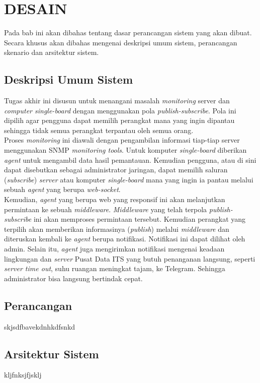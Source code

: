 \chapter{DESAIN}
\label{chapter:desain}

\tab Pada bab ini akan dibahas tentang dasar perancangan sistem yang akan dibuat. Secara khusus akan dibahas mengenai deskripsi umum sistem, perancangan skenario dan arsitektur
sistem.

\section{Deskripsi Umum Sistem}
\tab Tugas akhir ini disusun untuk menangani masalah \textit{monitoring} server dan \textit{computer single-board} dengan menggunakan pola \textit{publish-subscribe}. Pola ini dipilih agar pengguna dapat memilih perangkat mana yang ingin dipantau sehingga tidak semua perangkat terpantau oleh semua orang.\\
\tab Proses \textit{monitoring} ini diawali dengan pengambilan informasi tiap-tiap server menggunakan SNMP \textit{monitoring tools}. Untuk komputer \textit{single-board} diberikan \textit{agent} untuk mengambil data hasil pemantauan. Kemudian pengguna, atau di sini dapat disebutkan sebagai administrator jaringan, dapat memilih saluran (\textit{subscribe}) \textit{server} atau komputer \textit{single-board} mana yang ingin ia pantau melalui sebuah \textit{agent} yang berupa \textit{web-socket}.\\ 
\tab Kemudian, \textit{agent} yang berupa web yang responsif ini akan melanjutkan permintaan ke sebuah \textit{middleware}. \textit{Middleware} yang telah terpola \textit{publish-subscribe} ini akan memproses permintaan tersebut. Kemudian perangkat yang terpilih akan memberikan informasinya (\textit{publish}) melalui \textit{middleware} dan diteruskan kembali ke \textit{agent} berupa notifikasi. Notifikasi ini dapat dilihat oleh admin. Selain itu, \textit{agent} juga mengirimkan notifikasi mengenai keadaan lingkungan dan \textit{server} Pusat Data ITS yang butuh penanganan langsung, seperti \textit{server time out}, suhu ruangan meningkat tajam, ke Telegram. Sehingga administrator bisa langsung bertindak cepat.

\section{Perancangan}
skjsdfbavekdnhkdfsnkd

\section{Arsitektur Sistem}
kljfnksjfjsklj
